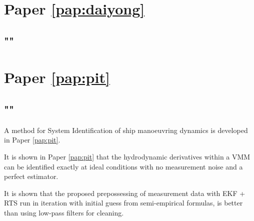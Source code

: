 \section{Paper \ref{pap:daiyong}}
\subsection*{""}

\section{Paper \ref{pap:pit}}
\subsection*{""}
A method for System Identification of ship manoeuvring dynamics is developed in Paper \ref{pap:pit}. 

It is shown in Paper \ref{pap:pit} that the hydrodynamic derivatives within a VMM can be identified exactly at ideal conditions with no measurement noise and a perfect estimator.

It is shown that the proposed prepossessing of measurement data with EKF + RTS run in iteration with initial guess from semi-empirical formulas, is better than using low-pass filters for cleaning. 